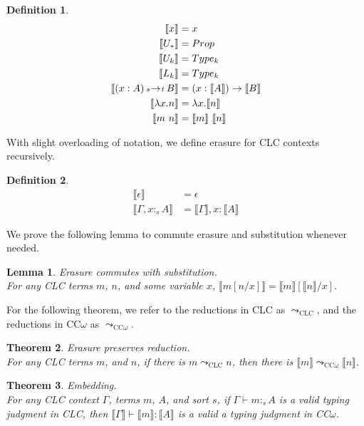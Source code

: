 \documentclass{article}
\newtheorem{theorem}{Theorem}[section]
\newtheorem{lemma}[theorem]{Lemma}
\theoremstyle{definition}
\newtheorem{definition}{Definition}[section]
\newcommand{\stype}[1]{:_#1}
\newcommand{\pstep}{\leadsto}
\newcommand{\arw}[2]
{\hspace*{0.2em}{\scriptstyle #1}\hspace*{-0.2em}
\rightarrow
\hspace*{-0.2em}{\scriptstyle #2}\hspace*{0.2em}}
\newcommand{\erase}[1]{\llbracket #1 \rrbracket}
\begin{document}
  \begin{definition}
    \begin{align*}
      \erase{x} &= x \\
      \erase{U_*} &= Prop \\
      \erase{U_k} &= Type_k \\
      \erase{L_k} &= Type_k \\
      \erase{(x : A) \arw{s}{t} B} &= (x : \erase{A}) \rightarrow \erase{B} \\
      \erase{\lambda x.n} &= \lambda x.\erase{n} \\
      \erase{m\ n} &= \erase{m}\ \erase{n}
    \end{align*}
  \end{definition}

  With slight overloading of notation, we define erasure for CLC contexts recursively.

  \begin{definition}
    \begin{align*}
      \erase{\epsilon} &= \epsilon \\
      \erase{\Gamma, x \stype{s} A} &= \erase{\Gamma}, x : \erase{A}
    \end{align*}
  \end{definition}

  We prove the following lemma to commute erasure and substitution whenever needed.
  \begin{lemma} Erasure commutes with substitution. \\ 
    For any CLC terms $m$, $n$, and some variable $x$, $\erase{m[n/x]} = \erase{m}[\erase{n}/x]$. 
  \end{lemma}

  For the following theorem, we refer to the reductions in CLC as $\pstep_{\scriptscriptstyle \text{CLC}}$, and the reductions in CC$\omega$ as $\pstep_{\scriptscriptstyle \text{CC$\omega$}}$.
  \begin{theorem} \label{preserve} Erasure preserves reduction. \\
    For any CLC terms $m$, and $n$, if there is $m \pstep_{\scriptscriptstyle \text{CLC}} n$, then there is $\erase{m} \pstep_{\scriptscriptstyle \text{CC$\omega$}} \erase{n}$.
  \end{theorem}

  \begin{theorem} \label{embedding} Embedding. \\
    For any CLC context $\Gamma$, terms $m$, $A$, and sort $s$, if $\Gamma \vdash m \stype{s} A$ is a valid typing judgment in CLC, then $\erase{\Gamma} \vdash \erase{m} : \erase{A}$ is a valid a typing judgment in CC$\omega$.
  \end{theorem}
\end{document}
